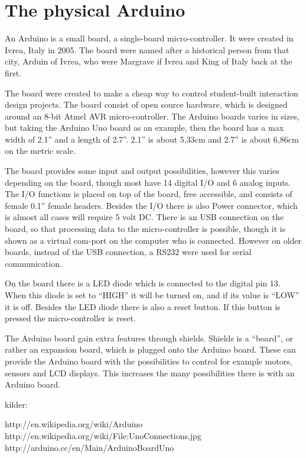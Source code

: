 
\section{The physical Arduino}
An Arduino is a small board, a single-board micro-controller. It were created in Ivrea, Italy in 2005. The board were named after a historical person from that city, Arduin of Ivrea, who were Margrave if Ivrea and King of Italy back at the first. 

The board were created to make a cheap way to control student-built interaction design projects. The board consist of open source hardware, which is designed around an 8-bit Atmel AVR micro-controller. The Arduino boards varies in sizes, but taking the Arduino Uno board as an example, then the board has a max width of 2.1'' and a length of 2.7''. 2.1'' is about 5,33cm and 2.7'' is about 6,86cm on the metric scale. 

The board provides some input and output possibilities, however this varies depending on the board, though most have 14 digital I/O and 6 analog inputs. The I/O functions is placed on top of the board, free accessible, and consists of female 0.1'' female headers. Besides the I/O there is also Power connector, which is almost all cases will require 5 volt DC. There is an USB connection on the board, so that processing data to the micro-controller is possible, though it is shown as a virtual com-port on the computer who is connected. However on older boards, instead of the USB connection, a RS232 were used for serial communication. 

On the board there is a LED diode which is connected to the digital pin 13. When this diode is set to ``HIGH'' it will be turned on, and if its value is ``LOW'' it is off. Besides the LED diode there is also a reset button. If this button is pressed the micro-controller is reset. 

The Arduino board gain extra features through shields. Shields is a ``board'', or rather an expansion board, which is plugged onto the Arduino board. These can provide the Arduino board with the possibilities to control for example motors, sensors and LCD displays. This increases the many possibilities there is with an Arduino board. 

kilder:

http://en.wikipedia.org/wiki/Arduino
http://en.wikipedia.org/wiki/File:UnoConnections.jpg
http://arduino.cc/en/Main/ArduinoBoardUno
